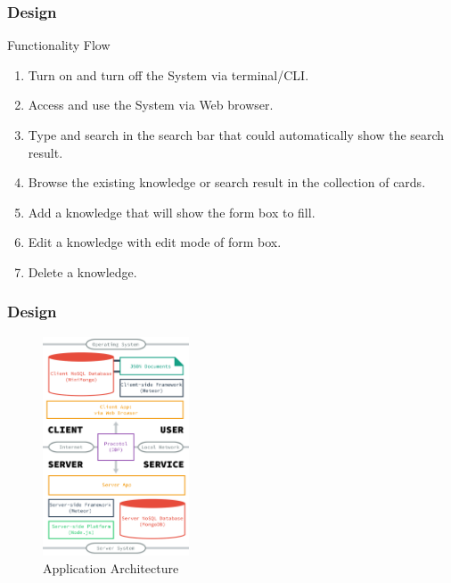 \documentclass[10pt, compress]{beamer}
\begin{document}

\begin{frame}[fragile]
  \frametitle{Design}

  Functionality Flow
  \begin{enumerate} \itemsep0pt
    \item Turn on and turn off the System via terminal/CLI.
    \item Access and use the System via Web browser.
    \item Type and search in the search bar that could automatically show the search result.
    \item Browse the existing knowledge or search result in the collection of cards.
    \item Add a knowledge that will show the form box to fill.
    \item Edit a knowledge with edit mode of form box.
    \item Delete a knowledge.
  \end{enumerate}

\end{frame}


\begin{frame}[fragile]
  \frametitle{Design}

  \begin{figure}[ht]
    \centering
    \includegraphics[height=6.5cm]{include/satellid-app-arch.png}
    \caption{Application Architecture}
    \label{fig:satellid-app-arch}
  \end{figure}

\end{frame}

\end{document}
